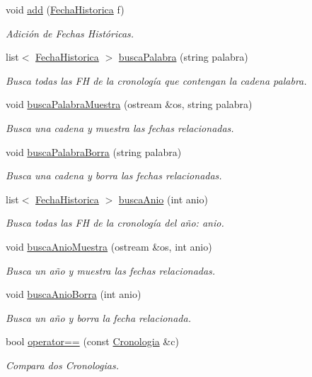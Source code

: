 \begin{DoxyCompactItemize}
void \hyperlink{classCronologia_a074d231653a08d759ddeb6e5788029f9}{add} (\hyperlink{classFechaHistorica}{Fecha\+Historica} f)
\begin{DoxyCompactList}\small\item\em Adición de Fechas Históricas. \end{DoxyCompactList}\item 
list$<$ \hyperlink{classFechaHistorica}{Fecha\+Historica} $>$ \hyperlink{classCronologia_a9dea9900b903e30a28333b146350aa47}{busca\+Palabra} (string palabra)
\begin{DoxyCompactList}\small\item\em Busca todas las FH de la cronología que contengan la cadena {\itshape palabra}. \end{DoxyCompactList}\item 
void \hyperlink{classCronologia_aae687de86ad56c86f30fb6908f51222b}{busca\+Palabra\+Muestra} (ostream \&os, string palabra)
\begin{DoxyCompactList}\small\item\em Busca una cadena y muestra las fechas relacionadas. \end{DoxyCompactList}\item 
void \hyperlink{classCronologia_a5326dafa3c78b064c6e461098e50882c}{busca\+Palabra\+Borra} (string palabra)
\begin{DoxyCompactList}\small\item\em Busca una cadena y borra las fechas relacionadas. \end{DoxyCompactList}\item 
list$<$ \hyperlink{classFechaHistorica}{Fecha\+Historica} $>$ \hyperlink{classCronologia_aab9a8231643b9d6bbe571f64c04cf1e1}{busca\+Anio} (int anio)
\begin{DoxyCompactList}\small\item\em Busca todas las FH de la cronología del año\+: {\itshape anio}. \end{DoxyCompactList}\item 
void \hyperlink{classCronologia_a61d069aa6c7bdac972796605a7d716c2}{busca\+Anio\+Muestra} (ostream \&os, int anio)
\begin{DoxyCompactList}\small\item\em Busca un año y muestra las fechas relacionadas. \end{DoxyCompactList}\item 
void \hyperlink{classCronologia_a778115222477ac158102c9ed2f13dc02}{busca\+Anio\+Borra} (int anio)
\begin{DoxyCompactList}\small\item\em Busca un año y borra la fecha relacionada. \end{DoxyCompactList}\item 
bool \hyperlink{classCronologia_a0912ed9512d7a3ad8fb63ec6acc248d5}{operator==} (const \hyperlink{classCronologia}{Cronologia} \&c)
\begin{DoxyCompactList}\small\item\em Compara dos Cronologias. \end{DoxyCompactList}\end{DoxyCompactItemize}
